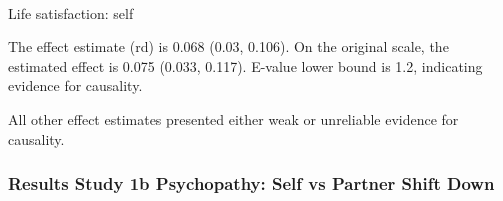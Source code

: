 \documentclass[
  single column]{article}
\makeatletter
\let\oldparagraph\paragraph
\renewcommand{\paragraph}{
    \@ifstar
      \xxxParagraphStar
      \xxxParagraphNoStar
  }
\newcommand{\xxxParagraphStar}[1]{\oldparagraph*{#1}\mbox{}}
\newcommand{\xxxParagraphNoStar}[1]{\oldparagraph{#1}\mbox{}}
\makeatother
\begin{document}
\paragraph{Life satisfaction: self}\label{life-satisfaction-self-5}

The effect estimate (rd) is 0.068 (0.03, 0.106). On the original scale,
the estimated effect is 0.075 (0.033, 0.117). E-value lower bound is
1.2, indicating evidence for causality.

All other effect estimates presented either weak or unreliable evidence
for causality.

\subsubsection{Results Study 1b Psychopathy: Self vs Partner Shift
Down}\label{results-study-1b-psychopathy-self-vs-partner-shift-down}
\end{document}
